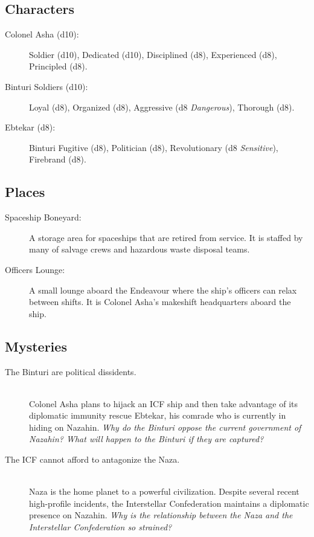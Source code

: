 \documentclass[11pt, a5paper, parskip=half-, DIV=12]{scrartcl}
\begin{document}
\newpage

\subsection*{Characters}
\begin{description}
	\item[Colonel Asha (d10):] Soldier (d10), Dedicated (d10), Disciplined (d8), Experienced (d8), Principled (d8).
	\item[Binturi Soldiers (d10):]  Loyal (d8), Organized (d8), Aggressive (d8 \textit{Dangerous}), Thorough (d8). 
	\item[Ebtekar (d8):] Binturi Fugitive (d8), Politician (d8), Revolutionary (d8 \textit{Sensitive}), Firebrand (d8).
\end{description}

\subsection*{Places}
\begin{description}
	\item[Spaceship Boneyard:] A storage area for spaceships that are retired from service. It is staffed by many of salvage crews and hazardous waste disposal teams.
	\item[Officers Lounge:] A small lounge aboard the Endeavour where the ship's officers can relax between shifts. It is Colonel Asha's makeshift headquarters aboard the ship.
\end{description}

\subsection*{Mysteries}
\begin{description}
	\item[The Binturi are political dissidents.] \phantom{a} \\ Colonel Asha plans to hijack an ICF ship and then take advantage of its diplomatic immunity rescue Ebtekar, his comrade who is currently in hiding on Nazahin. \textit{Why do the Binturi oppose the current government of Nazahin? What will happen to the Binturi if they are captured?}
	\item[The ICF cannot afford to antagonize the Naza.] \phantom{} \\ Naza is the home planet to a powerful civilization. Despite several recent high-profile incidents, the Interstellar Confederation maintains a diplomatic presence on Nazahin. \textit{Why is the relationship between the Naza and the Interstellar Confederation so strained?}
\end{description}
\end{document}
